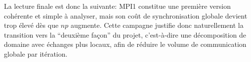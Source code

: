 La lecture finale est donc la suivante: MPI1 constitue une première version cohérente et simple à
analyser, mais son coût de synchronisation globale devient trop élevé dès que \(np\) augmente.
Cette campagne justifie donc naturellement la transition vers la ``deuxième façon'' du projet,
c'est-à-dire une décomposition de domaine avec échanges plus locaux, afin de réduire le volume
de communication globale par itération.
